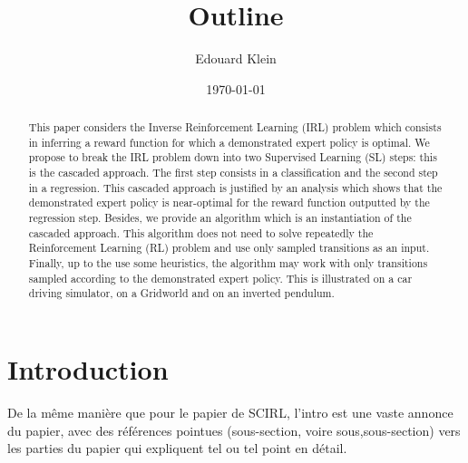 \documentclass[11pt]{article}
\title{Outline}
\author{Edouard Klein}
\date{\today}
\begin{document}
\maketitle

\setcounter{tocdepth}{3}
\tableofcontents
\vspace*{1cm}
\begin{abstract}
  This paper considers the Inverse Reinforcement Learning (IRL) problem which consists in inferring a reward function for which a demonstrated expert policy is optimal.
We propose to break the IRL problem down into two Supervised Learning (SL) steps: this is the cascaded approach. The first step consists in a classification and the second step in a regression.
This cascaded approach is justified by an analysis which shows that the demonstrated expert policy is near-optimal for the reward function outputted by the regression step. Besides, we provide an algorithm which is an instantiation of the cascaded approach. This algorithm does not need to solve repeatedly the Reinforcement Learning (RL) problem and use only sampled transitions as an input.
Finally, up to the use some heuristics, the algorithm may work with only transitions sampled according to the demonstrated expert policy. This is illustrated on a car driving simulator, on a Gridworld and on an inverted pendulum.
  \end{abstract}
\section{Introduction}
\label{sec-2}

  De la même manière que pour le papier de SCIRL, l'intro est une vaste annonce du papier, avec des références pointues (sous-section, voire sous,sous-section) vers les parties du papier qui expliquent tel ou tel point en détail.
\end{document}
